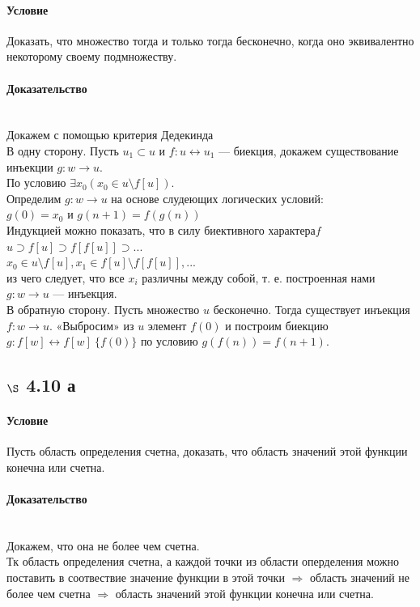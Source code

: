 \documentclass[a4paper,12pt]{article}
\begin{document}
\paragraph*{Условие}
Доказать, что множество тогда и только тогда бесконечно, когда оно эквивалентно некоторому своему подмножеству.
\paragraph*{Доказательство}\mbox{}\\
Докажем с помощью критерия Дедекинда\\
В одну сторону. Пусть $u_1 \subset u$ и $ f: u \leftrightarrow u_1$ — биекция, докажем существование инъекции $ g : w \rightarrow u$.\\
По условию $ \exists x_0 ( x_0 \in u \setminus f \left[  u \right] ) $. \\
Определим  $ g : w \rightarrow u $ на основе слудеющих логических условий:\\
$ g(0) = x_0$ и $ g(n+1) = f(g(n)) $\\
Индукцией можно показать, что в силу биективного характера$ f $\\
$ u \supset f[u]  \supset f[f[u]] \supset ...$\\
$ x_0 \in u\setminus f[u], x_1 \in f[u] \setminus f[f[u]], ...$\\
из чего следует, что все $ x_i $ различны между собой, т. е. построенная нами $ g : w \rightarrow u $ — инъекция.\\
В обратную сторону. Пусть множество $u$ бесконечно. Тогда существует инъекция $ f : w \rightarrow u$. «Выбросим» из $u$ элемент $f(0)$ и построим биекцию $ g : f[w] \leftrightarrow f[w] \ \{f(0)\}$ по условию $g(f(n)) = f(n+1)$.

\subsection*{$\S$ 4.10 а}
\paragraph*{Условие}
Пусть область определения счетна, доказать, что область значений этой функции конечна или счетна. \paragraph*{Доказательство}\mbox{}\\
Докажем, что она не более чем счетна.\\
Тк область определения счетна, а каждой точки из области оперделения можно поставить в соотвествие значение функции в этой точки $\Rightarrow$ область значений не более чем счетна $\Rightarrow$ область значений этой функции конечна или счетна.\\
\end{document}
